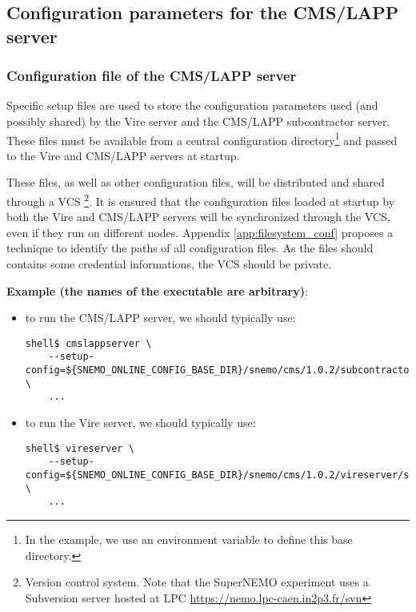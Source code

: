 
\subsection{Configuration parameters for the CMS/LAPP server}

\subsubsection{Configuration file of the CMS/LAPP server}

Specific setup  files are used  to store the  configuration parameters
used  (and  possibly shared)  by  the  Vire  server and  the  CMS/LAPP
subcontractor server.   These files must  be available from  a central
configuration directory\footnote{In the example, we use an environment
  variable to define this base directory.}  and passed to the Vire and
CMS/LAPP servers at startup.

These files, as well as other configuration files, will be distributed
and shared through a VCS  \footnote{Version control system.  Note that
  the  SuperNEMO experiment  uses a  Subversion server  hosted at  LPC
  \url{https://nemo.lpc-caen.in2p3.fr/svn}}.  It  is ensured  that the
configuration files  loaded at startup  by both the Vire  and CMS/LAPP
servers  will be  synchronized through  the VCS,  even if  they run  on
different  nodes.    Appendix  \ref{app:filesystem_conf}   proposes  a
technique to identify the paths of all configuration files.
As the files should contains some credential informations, the VCS should
be private.


\vskip 10pt
\noindent \textbf{Example (the names of the executable are arbitrary)}:
\begin{itemize}

\item to run the CMS/LAPP server, we should typically use:
  \vskip 10pt
  \small
  \begin{Verbatim}[frame=single,xleftmargin=0.cm,label=\fbox{shell}]
    shell$ cmslappserver \
    --setup-config=${SNEMO_ONLINE_CONFIG_BASE_DIR}/snemo/cms/1.0.2/subcontractors/cmslapp/setup.conf \
    ...
  \end{Verbatim}
  \normalsize

\item to run the Vire server, we should typically use:
  \vskip 10pt
  \small
  \begin{Verbatim}[frame=single,xleftmargin=0.cm,label=\fbox{shell}]
    shell$ vireserver \
    --setup-config=${SNEMO_ONLINE_CONFIG_BASE_DIR}/snemo/cms/1.0.2/vireserver/setup.conf \
    ...
  \end{Verbatim}
  \normalsize
\end{itemize}

